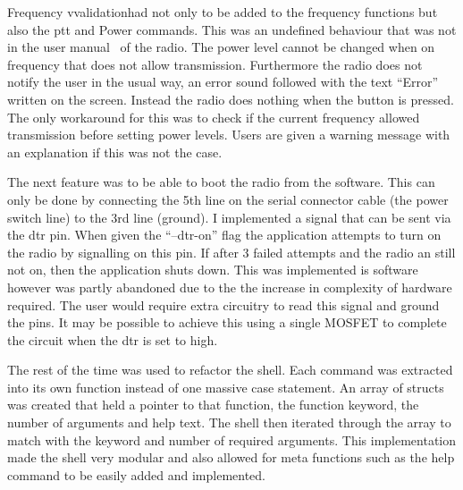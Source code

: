 Frequency vvalidationhad not only to be added to the frequency functions but also the \gls{ptt} and Power commands. This was an undefined behaviour that was not in the user manual~\cite{user_manual} of the radio. The power level cannot be changed when on frequency that does not allow transmission. Furthermore the radio does not notify the user in the usual way, an error sound followed with the text ``Error'' written on the screen. Instead the radio does nothing when the button is pressed. The only workaround for this was to check if the current frequency allowed transmission before setting power levels. Users are given a warning message with an explanation if this was not the case.

The next feature was to be able to boot the radio from the software. This can only be done by connecting the 5th line on the serial connector cable (the power switch line) to the 3rd line (ground). I implemented a signal that can be sent via the \gls{dtr} pin.  When given the ``--dtr-on'' flag the application attempts to turn on the radio by signalling on this pin. If after 3 failed attempts and the radio an still not on, then the application shuts down. This was implemented is software however was partly abandoned due to the the increase in complexity of hardware required. The user would require extra circuitry to read this signal and ground the pins. It may be possible to achieve this using a single \gls{MOSFET} to complete the circuit when the \gls{dtr} is set to high.

The rest of the time was used to refactor the shell. Each command was extracted into its own function instead of one massive case statement. An array of structs was created that held a pointer to that function, the function keyword, the number of arguments and help text. The shell then iterated through the array to match with the keyword and number of required arguments. This implementation made the shell very modular and also allowed for meta functions such as the help command to be easily added and implemented.